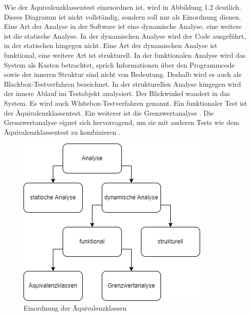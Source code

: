 Wie der Äquivalenzklassentest einzuordnen ist, wird in Abbildung 1.2 deutlich.
Dieses Diagramm ist nicht vollständig, sondern soll nur als Einordnung dienen.
Eine Art der Analyse in der Software ist eine dynamische Analyse, eine weitere ist die statische Analyse.
In der dynamischen Analyse
wird der Code ausgeführt, in der statischen hingegen nicht. Eine Art der dynamischen Analyse ist funktional, eine weitere Art ist strukturell.
In der funktionalen Analyse wird das System als Kasten betrachtet, sprich Informationen über den Programmcode sowie
der inneren Struktur sind nicht von Bedeutung. Deshalb wird es auch als Blackbox-Testverfahren bezeichnet.
In der strukturellen Analyse hingegen wird der innere Ablauf im Testobjekt analysiert. Der Blickwinkel wandert
in das System. Es wird auch Whitebox-Testverfahren genannt.
Ein funktionaler Test ist der Äquivalenzklassentest. 
Ein weiterer ist die Grenzwertanalyse \cite[vgl.][S. 114 ff.]{equiinformatic}\cite[vgl.][]{dynamischeanalyse1}\cite[vgl.][]{dynamischeanalyse2}.
Die Grenzwertanalyse eignet sich hervorragend, um sie mit anderen Tests wie dem Äquivalenzklassentest 
zu kombinieren \cite[vgl.][S. 36]{integration}.\par
\begin{figure}[h]
\centering
\includegraphics[scale=0.9,]{Bilder/Einordnung.drawio.png}
\caption{Einordnung der Äquivalenzklassen \cite[vgl.][]{dynamischeanalyse1}\cite[vgl.][]{dynamischeanalyse2}\cite[vgl.][S. 114 ff.]{equiinformatic}}
\end{figure}





